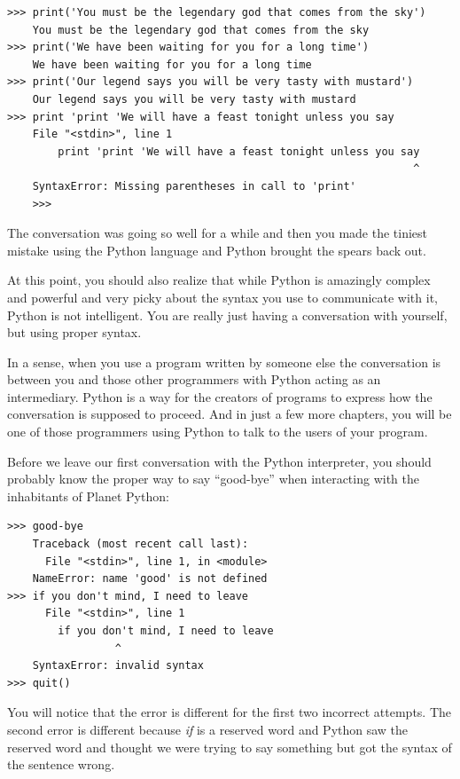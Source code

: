 \begin{Verbatim}[frame=single]
>>> print('You must be the legendary god that comes from the sky')
    You must be the legendary god that comes from the sky
>>> print('We have been waiting for you for a long time')
    We have been waiting for you for a long time
>>> print('Our legend says you will be very tasty with mustard')
    Our legend says you will be very tasty with mustard
>>> print 'print 'We will have a feast tonight unless you say
    File "<stdin>", line 1
        print 'print 'We will have a feast tonight unless you say
                                                                ^
    SyntaxError: Missing parentheses in call to 'print'
    >>>
\end{Verbatim}

The conversation was going so well for a while and then you made the tiniest mistake using the Python language and Python brought the spears back out.

At this point, you should also realize that while Python is amazingly complex and powerful and very picky about the syntax you use to communicate with it, Python is not intelligent. You are really just having a conversation with yourself, but using proper syntax.

In a sense, when you use a program written by someone else the conversation is between you and those other programmers with Python acting as an intermediary. Python is a way for the creators of programs to express how the conversation is supposed to proceed. And in just a few more chapters, you will be one of those programmers using Python to talk to the users of your program.

Before we leave our first conversation with the Python interpreter, you should probably know the proper way to say ``good-bye'' when interacting with the inhabitants of Planet Python:

\begin{Verbatim}[frame=single]
>>> good-bye
    Traceback (most recent call last):
      File "<stdin>", line 1, in <module>
    NameError: name 'good' is not defined
>>> if you don't mind, I need to leave
      File "<stdin>", line 1
        if you don't mind, I need to leave
                 ^
    SyntaxError: invalid syntax
>>> quit()
\end{Verbatim}

You will notice that the error is different for the first two incorrect attempts. The second error is different because \emph{if} is a reserved word and Python saw the reserved word and thought we were trying to say something but got the syntax of the sentence wrong.

